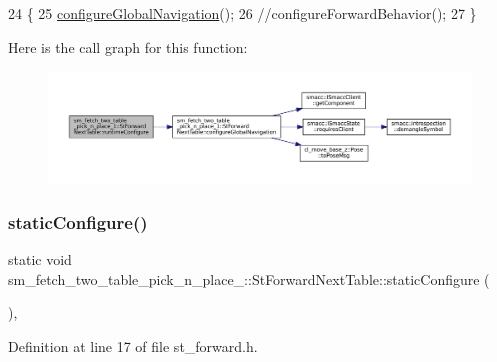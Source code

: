 \begin{DoxyCode}
24   \{
25     \hyperlink{structsm__fetch__two__table__pick__n__place__1_1_1StForwardNextTable_a7b7d04ab57af4686b394afda86c891af}{configureGlobalNavigation}();
26     \textcolor{comment}{//configureForwardBehavior();}
27   \}
\end{DoxyCode}
Here is the call graph for this function\+:
\nopagebreak
\begin{figure}[H]
\begin{center}
\leavevmode
\includegraphics[width=350pt]{structsm__fetch__two__table__pick__n__place__1_1_1StForwardNextTable_a06a2121565cde48bb62e3037c17418a7_cgraph}
\end{center}
\end{figure}
\mbox{\label{structsm__fetch__two__table__pick__n__place__1_1_1StForwardNextTable_a73fcf4091decc1ba1129a547a50f6ff3}} 
\subsubsection{\texorpdfstring{static\+Configure()}{staticConfigure()}}
{\footnotesize\ttfamily static void sm\+\_\+fetch\+\_\+two\+\_\+table\+\_\+pick\+\_\+n\+\_\+place\+\_\+::\+St\+Forward\+Next\+Table\+::static\+Configure (\begin{DoxyParamCaption}{ }\end{DoxyParamCaption})\hspace{0.3cm}{\ttfamily [inline]}, {\ttfamily [static]}}



Definition at line 17 of file st\+\_\+forward.\+h.


